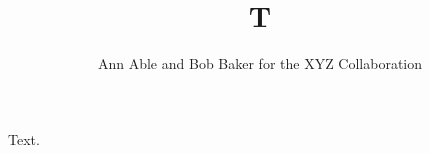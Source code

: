 \documentclass{article}
\begin{document}
\title{T}
\author{Ann Able and Bob Baker for the XYZ Collaboration}
\maketitle
Text.
\end{document}
